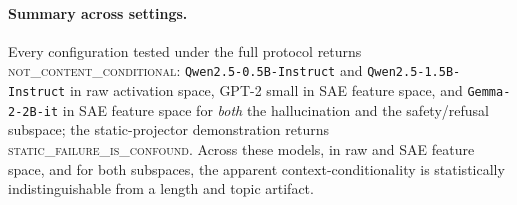 \paragraph{Summary across settings.} Every configuration tested under the full protocol returns
\textsc{not\_content\_conditional}: \texttt{Qwen2.5-0.5B-Instruct} and
\texttt{Qwen2.5-1.5B-Instruct} in raw activation space, GPT-2 small in SAE feature space, and
\texttt{Gemma-2-2B-it} in SAE feature space for \emph{both} the hallucination and the
safety/refusal subspace; the static-projector demonstration returns
\textsc{static\_failure\_is\_confound}. Across these models, in raw and SAE feature space, and for
both subspaces, the apparent context-conditionality is statistically indistinguishable from a
length and topic artifact.

